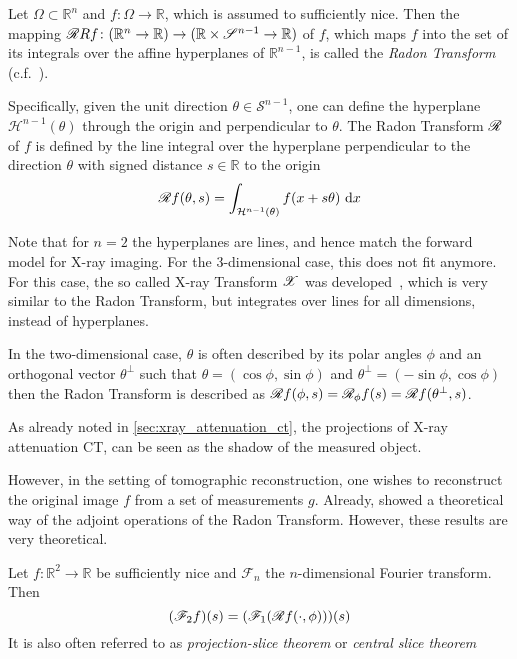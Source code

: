 \begin{definition}
	Let \(\Omega \subset \mathbb{R}^n\) and \(f\colon \Omega \to \mathbb{R}\), which is assumed
	to sufficiently nice. Then the mapping \(\radon{R}f\colon (\mathbb{R}^n \to \mathbb{R})
	\to (\mathbb{R} \times \mathscr{S}^{n-1} \to \mathbb{R})\) of \(f\), which maps \(f\) into
	the set of its integrals over the affine hyperplanes of \(\mathbb{R}^{n-1}\), is called the
	\textit{Radon Transform} (c.f.~\cite{natterer_mathematics_1986,buzug_computed_2008}).

\end{definition}
Specifically, given the unit direction \(\theta \in \mathcal{S}^{n-1}\), one can define the
hyperplane \(\mathcal{H}^{n-1}(\theta)\) through the origin and perpendicular to \(\theta\).
The Radon Transform \(\mathscr{R}\) of \(f\) is defined by the line integral over the
hyperplane perpendicular to the direction \(\theta\) with signed distance \(s \in
\mathbb{R}\) to the origin
\[ \mathscr{R} f(\theta, s) = \int_{\mathcal{H}^{n-1}(\theta)} f(x + s\theta) \, \, \mathrm{d}x \]

Note that for \(n=2\) the hyperplanes are lines, and hence match the forward model for X-ray
imaging. For the 3-dimensional case, this does not fit anymore. For this case, the so called X-ray
Transform \(\mathscr{X}\) was developed~\cite{solmon_x-ray_1976}, which is very similar to the Radon
Transform, but integrates over lines for all dimensions, instead of hyperplanes.

In the two-dimensional case, \(\theta\) is often described by its polar angles \(\phi\) and an
orthogonal vector \(\theta^\perp\) such that
\( \theta = (\cos \phi, \sin \phi)\) and \(\theta^\perp = (-\sin\phi, \cos\phi)\)
then the Radon Transform is described as \( \mathscr{R} f(\phi, s) = \mathscr{R}_\phi f(s) = \mathscr{R} f(\theta^\perp, s)\).

As already noted in \autoref{sec:xray_attenuation_ct}, the projections of X-ray attenuation CT, can
be seen as the shadow of the measured object.

However, in the setting of tomographic reconstruction, one wishes to reconstruct the original image
\(f\) from a set of measurements \(g\). Already, \citeauthor*{radon_uber_1917} showed a theoretical
way of the adjoint operations of the Radon Transform. However, these results are very theoretical.

\begin{definition}\label{def:fourier_slice_theorem}
	Let \(f\colon \mathbb{R}^2 \to \mathbb{R}\) be sufficiently nice and \(\mathscr{F}_n\) the
	\(n\)-dimensional Fourier transform. Then
	\[ (\mathscr{F}_2f)(s) = (\mathscr{F}_1(\mathscr{R} f(\cdot, \phi)))(s) \]
	It is also often referred to as \textit{projection-slice theorem} or \textit{central slice theorem}
\end{definition}

